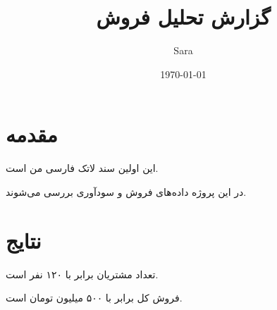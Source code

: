 \documentclass{article}
\begin{document}
\title{گزارش تحلیل فروش}
\author{Sara}
\date{\today}

\maketitle

\section{مقدمه}

این اولین سند لاتک فارسی من است.

در این پروژه داده‌های فروش و سودآوری بررسی می‌شوند.

\section{نتایج}

تعداد مشتریان برابر با ۱۲۰ نفر است.

فروش کل برابر با ۵۰۰ میلیون تومان است.
\end{document}
